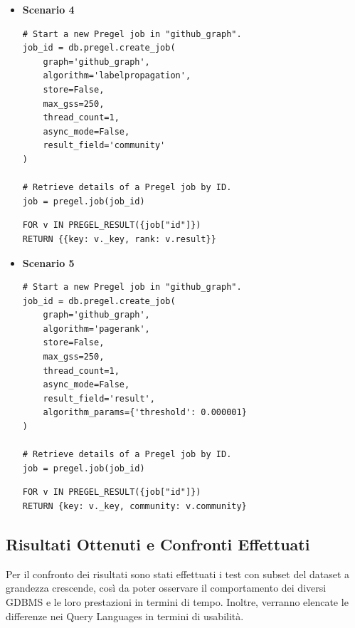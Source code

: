 \documentclass[11pt]{article}
\begin{document}
\begin{itemize}
\item \textbf{Scenario 4}
    \begin{lstlisting}[style = all, style = PythonStyle] 
# Start a new Pregel job in "github_graph".
job_id = db.pregel.create_job(
    graph='github_graph',
    algorithm='labelpropagation',
    store=False,
    max_gss=250,
    thread_count=1,
    async_mode=False,
    result_field='community'
)

# Retrieve details of a Pregel job by ID.
job = pregel.job(job_id)
\end{lstlisting}

\begin{lstlisting}[style = all, style = ArangoStyle] 
FOR v IN PREGEL_RESULT({job["id"]})
RETURN {{key: v._key, rank: v.result}}
\end{lstlisting}

\item \textbf{Scenario 5}
    \begin{lstlisting}[style = all, style = PythonStyle] 
# Start a new Pregel job in "github_graph".
job_id = db.pregel.create_job(
    graph='github_graph',
    algorithm='pagerank',
    store=False,
    max_gss=250,
    thread_count=1,
    async_mode=False,
    result_field='result',
    algorithm_params={'threshold': 0.000001}
)

# Retrieve details of a Pregel job by ID.
job = pregel.job(job_id)
\end{lstlisting}

\begin{lstlisting}[style = all, style = ArangoStyle] 
FOR v IN PREGEL_RESULT({job["id"]})
RETURN {key: v._key, community: v.community}
\end{lstlisting}

\end{itemize}


\subsection{Risultati Ottenuti e Confronti Effettuati}
Per il confronto dei risultati sono stati effettuati i test con subset del dataset a grandezza crescende, così da poter osservare il comportamento dei diversi GDBMS e le loro prestazioni in termini di tempo. Inoltre, verranno elencate le differenze nei Query Languages in termini di usabilità.
\end{document}
